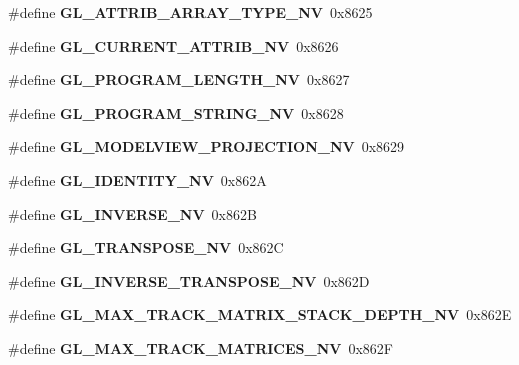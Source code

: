 \begin{DoxyCompactItemize}
\item 
\#define {\bfseries G\+L\+\_\+\+A\+T\+T\+R\+I\+B\+\_\+\+A\+R\+R\+A\+Y\+\_\+\+T\+Y\+P\+E\+\_\+\+N\+V}~0x8625\label{_s_d_l__opengl_8h_af9bb2b993fb601e83d8d204a294a4e58}

\item 
\#define {\bfseries G\+L\+\_\+\+C\+U\+R\+R\+E\+N\+T\+\_\+\+A\+T\+T\+R\+I\+B\+\_\+\+N\+V}~0x8626\label{_s_d_l__opengl_8h_a6141718b8526c4b10e631bc03ced2dd2}

\item 
\#define {\bfseries G\+L\+\_\+\+P\+R\+O\+G\+R\+A\+M\+\_\+\+L\+E\+N\+G\+T\+H\+\_\+\+N\+V}~0x8627\label{_s_d_l__opengl_8h_a8c6825010eed07eadfa291d96c1c6787}

\item 
\#define {\bfseries G\+L\+\_\+\+P\+R\+O\+G\+R\+A\+M\+\_\+\+S\+T\+R\+I\+N\+G\+\_\+\+N\+V}~0x8628\label{_s_d_l__opengl_8h_ad38b2a0dcd3ae914ec54d2904c05c066}

\item 
\#define {\bfseries G\+L\+\_\+\+M\+O\+D\+E\+L\+V\+I\+E\+W\+\_\+\+P\+R\+O\+J\+E\+C\+T\+I\+O\+N\+\_\+\+N\+V}~0x8629\label{_s_d_l__opengl_8h_adedfe2d8118aa41acd21b77c549d17a7}

\item 
\#define {\bfseries G\+L\+\_\+\+I\+D\+E\+N\+T\+I\+T\+Y\+\_\+\+N\+V}~0x862\+A\label{_s_d_l__opengl_8h_aed38ef7d3b31290feb616105633a5281}

\item 
\#define {\bfseries G\+L\+\_\+\+I\+N\+V\+E\+R\+S\+E\+\_\+\+N\+V}~0x862\+B\label{_s_d_l__opengl_8h_a68b2ee52e4d9e41ad25c0aad51fa9bae}

\item 
\#define {\bfseries G\+L\+\_\+\+T\+R\+A\+N\+S\+P\+O\+S\+E\+\_\+\+N\+V}~0x862\+C\label{_s_d_l__opengl_8h_aa332af8be4d7a375070c992e3d93cdfe}

\item 
\#define {\bfseries G\+L\+\_\+\+I\+N\+V\+E\+R\+S\+E\+\_\+\+T\+R\+A\+N\+S\+P\+O\+S\+E\+\_\+\+N\+V}~0x862\+D\label{_s_d_l__opengl_8h_a089b2b6e7ff5b82c321cf52bc8bbcab4}

\item 
\#define {\bfseries G\+L\+\_\+\+M\+A\+X\+\_\+\+T\+R\+A\+C\+K\+\_\+\+M\+A\+T\+R\+I\+X\+\_\+\+S\+T\+A\+C\+K\+\_\+\+D\+E\+P\+T\+H\+\_\+\+N\+V}~0x862\+E\label{_s_d_l__opengl_8h_aaa1bd0166d1045c9c35c4826a03e306b}

\item 
\#define {\bfseries G\+L\+\_\+\+M\+A\+X\+\_\+\+T\+R\+A\+C\+K\+\_\+\+M\+A\+T\+R\+I\+C\+E\+S\+\_\+\+N\+V}~0x862\+F\label{_s_d_l__opengl_8h_ac14bd9b6d090c347da79bc56ad868fae}


\end{DoxyCompactItemize}
